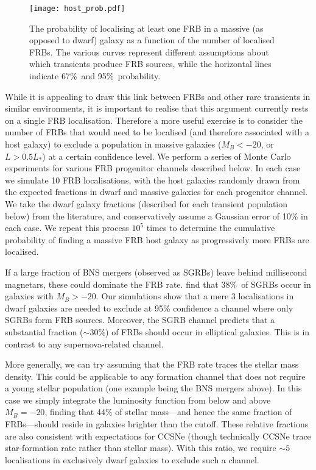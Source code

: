 \documentclass[twocolumn]{aastex6}
\begin{document}
\begin{figure}
\texttt{[image: host\_prob.pdf]}
\caption{%
The probability of localising at least one FRB in a massive (as opposed to dwarf) galaxy as a function of the number of localised FRBs. The various curves represent different assumptions about which transients produce FRB sources, while the horizontal lines indicate 67\%\ and 95\%\ probability.
}
\label{f:host}
\end{figure}


While it is appealing to draw this link between FRBs and other rare transients in similar environments, it is important to realise that this argument currently rests on a single FRB localisation. Therefore a more useful exercise is to consider the number of FRBs that would need to be localised (and therefore associated with a host galaxy) to exclude a population in massive galaxies ($M_B<-20$, or $L>0.5L_*$) at a certain confidence level. We perform a series of Monte Carlo experiments for various FRB progenitor channels described below. In each case we simulate 10 FRB localisations, with the host galaxies randomly drawn from the expected fractions in dwarf and massive galaxies for each progenitor channel. We take the dwarf galaxy fractions (described for each transient population below) from the literature, and conservatively assume a Gaussian error of 10\% in each case. We repeat this process $10^5$ times to determine the cumulative probability of finding a massive FRB host galaxy as progressively more FRBs are localised.

If a large fraction of BNS mergers (observed as SGRBs) leave behind millisecond magnetars, these could dominate the FRB rate. \citet{ber2014} find that 38\%\ of SGRBs occur in galaxies with $M_B>-20$. Our simulations show that a mere 3 localisations in dwarf galaxies are needed to exclude at 95\% confidence a channel where only SGRBs form FRB sources.  Moreover, the SGRB channel predicts that a substantial fraction ($\sim 30$\%) of FRBs should occur in elliptical galaxies. This is in contrast to any supernova-related channel.

More generally, we can try assuming that the FRB rate traces the stellar mass density. This could be applicable to any formation channel that does not require a young stellar population (one example being the BNS mergers above). In this case we simply integrate the luminosity function from \citet{fab2007} below and above $M_B=-20$, finding that 44\% of stellar mass---and hence the same fraction of FRBs---should reside in galaxies brighter than the cutoff. These relative fractions are also consistent with expectations for CCSNe (though technically CCSNe trace star-formation rate rather than stellar mass).  With this ratio, we require $\sim 5$ localisations in exclusively dwarf galaxies to exclude such a channel.
\end{document}
